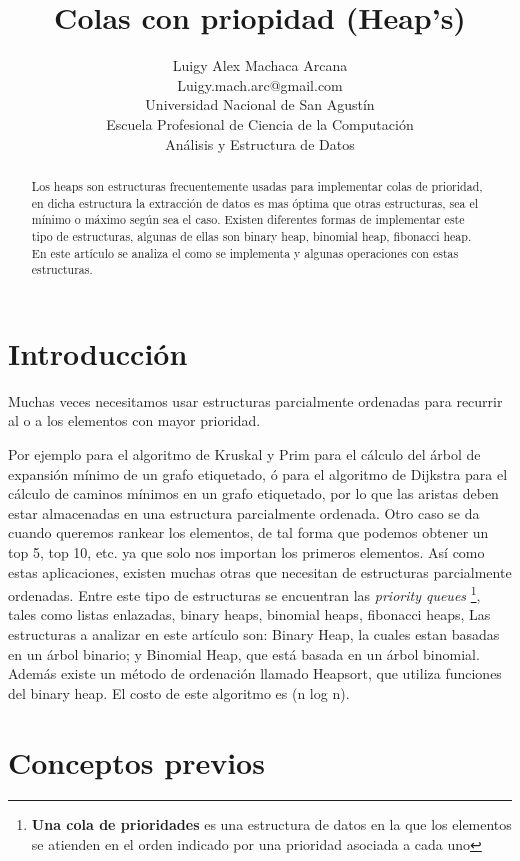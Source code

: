 \documentclass[a4paper,10pt]{article}
\title{Colas con priopidad (Heap's)}
\author{ \Large Luigy Alex Machaca Arcana \\Luigy.mach.arc@gmail.com \\ Universidad Nacional de San Agustín \\ Escuela Profesional de Ciencia de la Computación \\ Análisis y Estructura de Datos }
\begin{document}
\maketitle
\begin{abstract}
Los  heaps son estructuras frecuentemente usadas para implementar colas de prioridad, en dicha estructura la extracción de datos es mas óptima que otras estructuras, sea el mínimo o máximo según sea el caso. Existen diferentes formas de implementar este tipo de estructuras, algunas de ellas son binary heap, binomial heap, fibonacci heap. En este artículo se analiza el como se implementa y algunas operaciones con estas estructuras.
\end{abstract}

\section{Introducción}

Muchas veces necesitamos usar estructuras parcialmente ordenadas para recurrir al o a los elementos con mayor prioridad. 

Por ejemplo para el algoritmo de Kruskal y Prim para el cálculo del
árbol de expansión mínimo de un grafo etiquetado, ó para el algoritmo de Dijkstra para el cálculo de caminos
mínimos en un grafo etiquetado, por lo que las aristas deben estar almacenadas en una estructura parcialmente ordenada. Otro caso se da cuando queremos rankear los elementos, de tal forma que
podemos obtener un top 5, top 10, etc. ya que solo nos importan los primeros elementos. Así como estas aplicaciones, existen muchas otras que necesitan de estructuras parcialmente ordenadas. Entre este tipo de estructuras se encuentran las \textit{priority queues} \footnote{\textbf{Una cola de prioridades} es una estructura de datos en la que los elementos se atienden en el orden indicado por una prioridad asociada a cada uno}, tales como listas enlazadas, binary heaps, binomial heaps, fibonacci heaps,\cite{diapos} Las estructuras a analizar en este artículo son: Binary Heap, la cuales estan basadas en un árbol binario; y Binomial Heap, que está basada en un árbol binomial. Además existe un método de ordenación llamado Heapsort, que utiliza funciones del binary heap. El costo de este algoritmo es (n log n).




\section{Conceptos previos}
\end{document}

